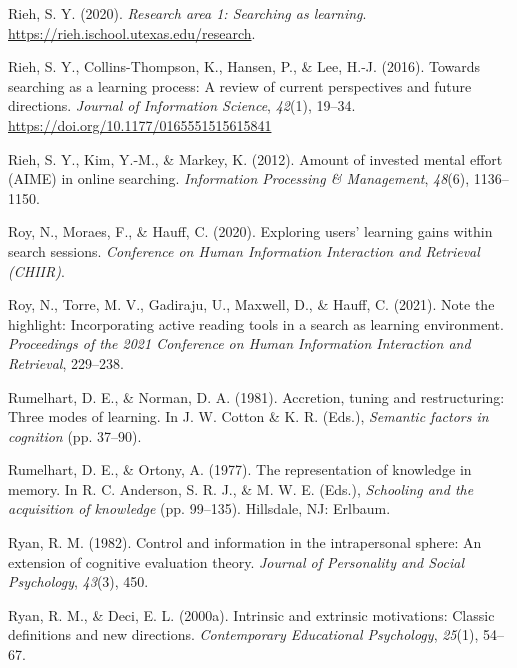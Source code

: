 \documentclass[letterpaper, nobind]{templates/ociamthesis}
\newlength{\cslhangindent}
\newenvironment{CSLReferences}[2] %
 {%
  \setlength{\parindent}{0pt}
  \ifodd #1
  \let\oldpar\par
  \def\par{\hangindent=\cslhangindent\oldpar}
  \fi
  \setlength{\parskip}{1mm}
  \setlength{\baselineskip}{6mm}
 }%
 {}
\begin{document}
\begin{CSLReferences}{1}{0}
\leavevmode{}%
Rieh, S. Y. (2020). \emph{Research area 1: Searching as learning}. \url{https://rieh.ischool.utexas.edu/research}.

\leavevmode{}%
Rieh, S. Y., Collins-Thompson, K., Hansen, P., \& Lee, H.-J. (2016). Towards searching as a learning process: A review of current perspectives and future directions. \emph{Journal of Information Science}, \emph{42}(1), 19--34. \url{https://doi.org/10.1177/0165551515615841}

\leavevmode{}%
Rieh, S. Y., Kim, Y.-M., \& Markey, K. (2012). Amount of invested mental effort (AIME) in online searching. \emph{Information Processing \& Management}, \emph{48}(6), 1136--1150.

\leavevmode{}%
Roy, N., Moraes, F., \& Hauff, C. (2020). Exploring users' learning gains within search sessions. \emph{Conference on Human Information Interaction and Retrieval (CHIIR)}.

\leavevmode{}%
Roy, N., Torre, M. V., Gadiraju, U., Maxwell, D., \& Hauff, C. (2021). Note the highlight: Incorporating active reading tools in a search as learning environment. \emph{Proceedings of the 2021 Conference on Human Information Interaction and Retrieval}, 229--238.

\leavevmode{}%
Rumelhart, D. E., \& Norman, D. A. (1981). Accretion, tuning and restructuring: Three modes of learning. In J. W. Cotton \& K. R. (Eds.), \emph{Semantic factors in cognition} (pp. 37--90).

\leavevmode{}%
Rumelhart, D. E., \& Ortony, A. (1977). The representation of knowledge in memory. In R. C. Anderson, S. R. J., \& M. W. E. (Eds.), \emph{Schooling and the acquisition of knowledge} (pp. 99--135). Hillsdale, NJ: Erlbaum.

\leavevmode{}%
Ryan, R. M. (1982). Control and information in the intrapersonal sphere: An extension of cognitive evaluation theory. \emph{Journal of Personality and Social Psychology}, \emph{43}(3), 450.

\leavevmode{}%
Ryan, R. M., \& Deci, E. L. (2000a). Intrinsic and extrinsic motivations: Classic definitions and new directions. \emph{Contemporary Educational Psychology}, \emph{25}(1), 54--67.


\end{CSLReferences}
\end{document}

